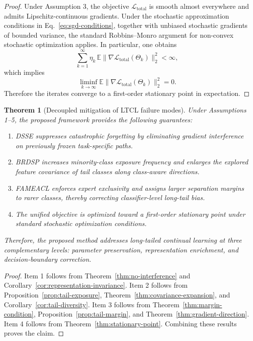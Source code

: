 \documentclass[journal]{IEEEtran}
\theoremstyle{plain}
\newtheorem{theorem}{Theorem}[section]
\theoremstyle{definition}
\theoremstyle{remark}
\begin{document}
\begin{proof}
Under Assumption 3, the objective $\mathcal{L}_{\mathrm{total}}$ is smooth almost everywhere and admits Lipschitz-continuous gradients. Under the stochastic approximation conditions in Eq.~\eqref{eq:sgd-conditions}, together with unbiased stochastic gradients of bounded variance, the standard Robbins--Monro argument for non-convex stochastic optimization applies. In particular, one obtains
\begin{equation}
\sum_{k=1}^{\infty}\eta_k\,\mathbb{E}\|\nabla \mathcal{L}_{\mathrm{total}}(\Theta_k)\|_2^2 < \infty,
\end{equation}
which implies
\begin{equation}
\liminf_{k\to\infty}\mathbb{E}\|\nabla \mathcal{L}_{\mathrm{total}}(\Theta_k)\|_2^2=0.
\end{equation}
Therefore the iterates converge to a first-order stationary point in expectation.
\end{proof}

\begin{theorem}[Decoupled mitigation of LTCL failure modes]
\label{thm:main-theory}
Under Assumptions 1--5, the proposed framework provides the following guarantees:
\begin{enumerate}
    \item DSSE suppresses catastrophic forgetting by eliminating gradient interference on previously frozen task-specific paths.
    \item BRDSP increases minority-class exposure frequency and enlarges the explored feature covariance of tail classes along class-aware directions.
    \item FAMEACL enforces expert exclusivity and assigns larger separation margins to rarer classes, thereby correcting classifier-level long-tail bias.
    \item The unified objective is optimized toward a first-order stationary point under standard stochastic optimization conditions.
\end{enumerate}

Therefore, the proposed method addresses long-tailed continual learning at three complementary levels: parameter preservation, representation enrichment, and decision-boundary correction.
\end{theorem}

\begin{proof}
Item 1 follows from Theorem~\ref{thm:no-interference} and Corollary~\ref{cor:representation-invariance}. Item 2 follows from Proposition~\ref{prop:tail-exposure}, Theorem~\ref{thm:covariance-expansion}, and Corollary~\ref{cor:tail-diversity}. Item 3 follows from Theorem~\ref{thm:margin-condition}, Proposition~\ref{prop:tail-margin}, and Theorem~\ref{thm:gradient-direction}. Item 4 follows from Theorem~\ref{thm:stationary-point}. Combining these results proves the claim.
\end{proof}
\end{document}
